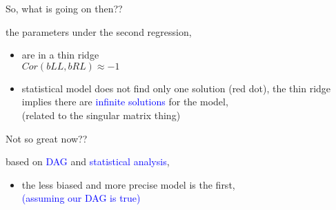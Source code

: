 %
%
\begin{lhframe}[rhgraphic={\texttt{[image: fork4\_triptych.pdf]}}]
	{So, what is going on then??}
	
	the parameters under the second regression,
	\begin{itemize}
		\item are in a thin ridge \\
		$Cor(bLL, bRL) \approx -1$
		\item statistical model does not find only one solution (\alert{red dot}), the thin ridge implies there are \textcolor{blue}{infinite solutions} for the model,\\
		{\small (related to the singular matrix thing)}
	\end{itemize}
\end{lhframe}
%
%
\begin{lhframe}[rhgraphic={\texttt{[image: fork4\_reg1.png]}}]
	{Not so great now??}
	
	based on \textcolor{blue}{DAG} and \textcolor{blue}{statistical analysis},
	\begin{itemize}
		\item the less biased and more precise model is the first, \\
		{\small \textcolor{blue}{(assuming our DAG is true)} }
	\end{itemize}
\end{lhframe}
%
%

